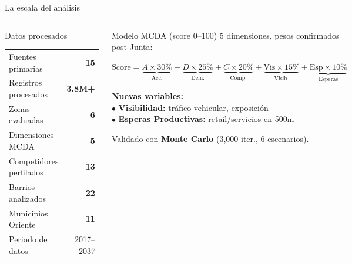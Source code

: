 \documentclass[aspectratio=169, 11pt]{beamer}
\newcommand{\src}[1]{\par\vspace{2pt}{\tiny\textcolor{slate}{Fuente: #1}}}
\begin{document}
\begin{frame}{La escala del análisis}

\begin{columns}[T]
\begin{block}{\small Datos procesados}
\scriptsize
\begin{tabular}{@{}lr@{}}
\toprule
Fuentes primarias & \textbf{15} \\
Registros procesados & \textbf{3.8M+} \\
Zonas evaluadas & \textbf{6} \\
Dimensiones MCDA & \textbf{5} \\
Competidores perfilados & \textbf{13} \\
Barrios analizados & \textbf{22} \\
Municipios Oriente & \textbf{11} \\
Periodo de datos & 2017--2037 \\
\bottomrule
\end{tabular}
\end{block}

\begin{exampleblock}{\small Modelo MCDA (score 0--100)}
\scriptsize
5 dimensiones, pesos confirmados post-Junta:

\vspace{3pt}
$\text{Score} = \underbrace{A \times 30\%}_{\text{Acc.}} + \underbrace{D \times 25\%}_{\text{Dem.}} + \underbrace{C \times 20\%}_{\text{Comp.}} + \underbrace{\text{Vis} \times 15\%}_{\text{Visib.}} + \underbrace{\text{Esp} \times 10\%}_{\text{Esperas}}$

\vspace{4pt}
\textbf{Nuevas variables:}\\
$\bullet$ \textbf{Visibilidad:} tráfico vehicular, exposición\\
$\bullet$ \textbf{Esperas Productivas:} retail/servicios en 500m

\vspace{3pt}
Validado con \textbf{Monte Carlo} (3,000 iter., 6 escenarios).
\end{exampleblock}
\end{columns}

\src{Catastro, REPS, MEData Aforos, DANE, POT, ANI, Mapbox, Google Places, OSM}
\end{frame}

\end{document}
